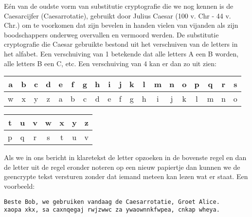E\'en van de oudste vorm van substitutie cryptografie die we nog kennen is de Caesarcijfer (Caesarrotatie), gebruikt door Julius Caesar (100 v. Chr - 44 v. Chr.) om te voorkomen dat zijn bevelen in handen vielen van vijanden als zijn boodschappers onderweg overvallen en vermoord werden. De substitutie cryptografie die Caesar gebruikte bestond uit het verschuiven van de letters in het alfabet. Een verschuiving van 1 betekende dat alle letters A een B worden, alle letters B een C, etc. Een verschuiving van 4 kan er dan zo uit zien:


\begin{tabular}{ | c | c | c | c | c | c | c | c | c | c | c | c | c | c | c | c | c | c | c | }
\hline
 a & b & c & d & e & f & g & h & i & j & k & l & m & n & o & p & q & r & s \\ 
\hline
 w & x & y & z & a & b & c & d & e & f & g & h & i & j & k & l & m & n & o \\
\hline
\end{tabular}

\begin{tabular}{ | c | c | c | c | c | c | c | }
\hline
 t & u & v & w & x & y & z \\ 
\hline
 p & q & r & s & t & u & v \\
\hline
\end{tabular}

Als we in ons bericht in klaretekst de letter opzoeken in de bovenste regel en dan de letter uit de regel eronder noteren op een nieuw papiertje dan kunnen we de geencrypte tekst versturen zonder dat iemand meteen kan lezen wat er staat. Een voorbeeld:

\begin{verbatim}
Beste Bob, we gebruiken vandaag de Caesarrotatie, Groet Alice.
xaopa xkx, sa caxnqegaj rwjzwwc za ywaownnkfwpea, cnkap wheya.
\end{verbatim}

